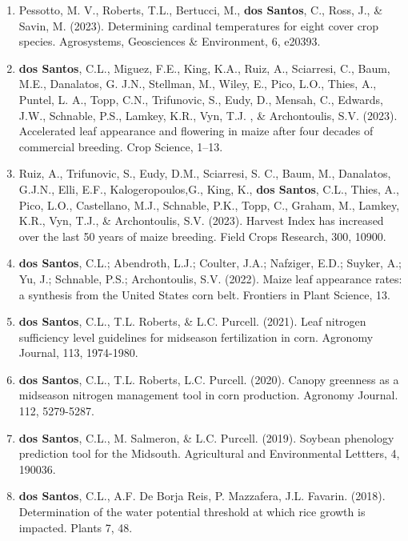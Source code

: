 \documentclass[letterpaper,10pt]{article}
\begin{document}
\begin{enumerate}
\item Pessotto, M. V., Roberts, T.L., Bertucci,
	M., {\bf dos Santos}, C., Ross, J., \&
	Savin, M. (2023). Determining cardinal
	temperatures for eight cover crop species.
	Agrosystems, Geosciences \& Environment,
	6, e20393.

\item {\bf dos Santos}, C.L., Miguez, F.E.,
	King, K.A., Ruiz, A., Sciarresi, C.,
	Baum, M.E., Danalatos, G. J.N.,
	Stellman, M., Wiley, E., Pico, L.O.,
	Thies, A., Puntel, L. A., Topp, C.N.,
	Trifunovic, S., Eudy, D., Mensah, C.,
	Edwards, J.W., Schnable, P.S., Lamkey,
	K.R., Vyn, T.J. , \& Archontoulis, S.V. (2023).
	Accelerated leaf appearance and flowering
	in maize after four decades of commercial
	breeding. Crop Science, 1–13.

\item Ruiz, A., Trifunovic, S., Eudy, D.M.,
	Sciarresi, S. C., Baum, M., Danalatos,
	G.J.N., Elli, E.F., Kalogeropoulos,G.,
	King, K., {\bf dos Santos}, C.L., Thies,
	A., Pico, L.O., Castellano, M.J.,
	Schnable, P.K., Topp, C., Graham, M.,
	Lamkey, K.R., Vyn, T.J., \& Archontoulis,
	S.V. (2023). Harvest Index has increased
	over the last 50 years of maize breeding.
	Field Crops Research, 300, 10900.

\item {\bf dos Santos}, C.L.; Abendroth, L.J.;
	Coulter, J.A.; Nafziger, E.D.; Suyker, A.;
	Yu, J.; Schnable, P.S.; Archontoulis, S.V.
	(2022). Maize leaf appearance rates: a
	synthesis from the United States corn
	belt. Frontiers in Plant Science, 13.

\item {\bf dos Santos}, C.L., T.L. Roberts, \&
	L.C. Purcell. (2021). Leaf nitrogen
	sufficiency level guidelines for midseason
	fertilization in corn. Agronomy Journal,
	113, 1974-1980.  

\item {\bf dos Santos}, C.L., T.L. Roberts, L.C.
	Purcell. (2020).  Canopy greenness as a
	midseason nitrogen management tool in corn
	production.  Agronomy Journal. 112,
	5279-5287.  

\item {\bf dos Santos}, C.L., M. Salmeron, \&
	L.C. Purcell. (2019). Soybean phenology
	prediction tool for the Midsouth.
	Agricultural and Environmental Lettters,
	4, 190036.

\item {\bf dos Santos}, C.L., A.F. De Borja Reis,
	P. Mazzafera, J.L.  Favarin. (2018).
	Determination of the water potential
	threshold at which rice growth is
	impacted. Plants 7, 48.

\end{enumerate}
\end{document}
